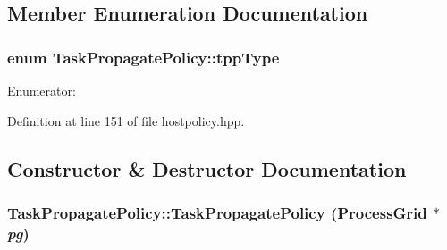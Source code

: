 \subsection{Member Enumeration Documentation}
\hypertarget{class_task_propagate_policy_a6c683eb92ff5d4fb9ea0b083732c13fd}{
\subsubsection[{tppType}]{\setlength{\rightskip}{0pt plus 5cm}enum {\bf TaskPropagatePolicy::tppType}}}
\label{class_task_propagate_policy_a6c683eb92ff5d4fb9ea0b083732c13fd}
\begin{Desc}
\item[Enumerator: ]\par
\begin{description}
\item[{\em 
\hypertarget{class_task_propagate_policy_a6c683eb92ff5d4fb9ea0b083732c13fda2d48d7fee629a2535833a384ae1a30ad}{
GROUP\_\-LEADER}
\label{class_task_propagate_policy_a6c683eb92ff5d4fb9ea0b083732c13fda2d48d7fee629a2535833a384ae1a30ad}
}]\item[{\em 
\hypertarget{class_task_propagate_policy_a6c683eb92ff5d4fb9ea0b083732c13fda59cd907f4d363e9b2cb3f2b96baad3e9}{
ALL\_\-CYCLIC}
\label{class_task_propagate_policy_a6c683eb92ff5d4fb9ea0b083732c13fda59cd907f4d363e9b2cb3f2b96baad3e9}
}]\end{description}
\end{Desc}



Definition at line 151 of file hostpolicy.hpp.

\subsection{Constructor \& Destructor Documentation}
\hypertarget{class_task_propagate_policy_aec820f83379ecb6be2fb180f59db893b}{
\subsubsection[{TaskPropagatePolicy}]{\setlength{\rightskip}{0pt plus 5cm}TaskPropagatePolicy::TaskPropagatePolicy ({\bf ProcessGrid} $\ast$ {\em pg})}}
\label{class_task_propagate_policy_aec820f83379ecb6be2fb180f59db893b}


